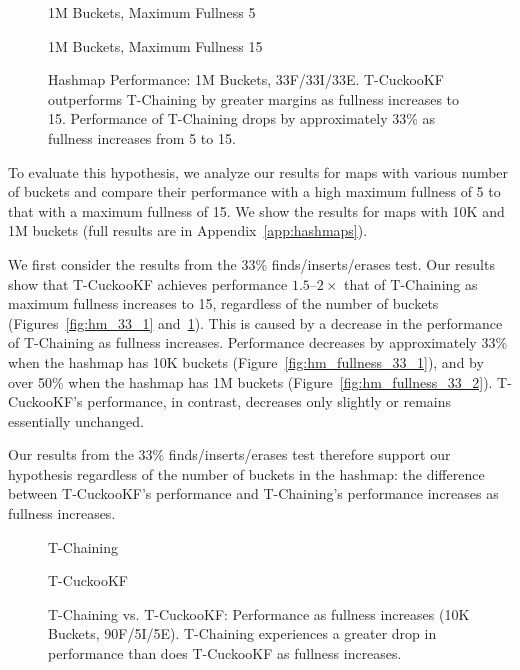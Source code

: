 \begin{figure}[H]
    \centering
    \begin{minipage}{0.75\textwidth}
    \caption*{1M Buckets, Maximum Fullness 5}
        \vspace{12pt}
    \end{minipage}
   \begin{minipage}{0.75\textwidth}
    \caption*{1M Buckets, Maximum Fullness 15}
        \vspace{12pt}
    \end{minipage}
	\caption[Hashmap Performance: 1M Buckets, 33F/33I/33E]{Hashmap Performance: 1M Buckets, 33F/33I/33E. T-CuckooKF outperforms T-Chaining by greater margins as fullness increases to 15. Performance of T-Chaining drops by approximately 33\% as fullness increases from 5 to 15.}
    \label{fig:hm_33_3}
\end{figure}

To evaluate this hypothesis, we analyze our results for maps with various number of buckets and compare their performance with a high maximum fullness of 5 to that with a maximum fullness of 15. We show the results for maps with 10K and 1M buckets (full results are in Appendix~\ref{app:hashmaps}).

We first consider the results from the 33\% finds/inserts/erases test. Our results show that T-CuckooKF achieves performance $1.5$--$2\times$ that of T-Chaining as maximum fullness increases to 15, regardless of the number of buckets (Figures~\ref{fig:hm_33_1} and~\ref{fig:hm_33_3}). 
This is caused by a decrease in the performance of T-Chaining as fullness increases. Performance decreases by approximately 33\% when the hashmap has 10K buckets (Figure~\ref{fig:hm_fullness_33_1}), and by over 50\% when the hashmap has 1M buckets (Figure~\ref{fig:hm_fullness_33_2}). T-CuckooKF's performance, in contrast, decreases only slightly or remains essentially unchanged.

Our results from the 33\% finds/inserts/erases test therefore support our hypothesis regardless of the number of buckets in the hashmap: the difference between T-CuckooKF's performance and T-Chaining's performance increases as fullness increases. 

\begin{figure}[H]
    \centering
    \begin{minipage}{0.7\textwidth}
    \caption*{T-Chaining}
        \vspace{12pt}
    \end{minipage}
    \begin{minipage}{0.7\textwidth}
    \caption*{T-CuckooKF}
    \end{minipage}
    \caption[T-Chaining vs. T-CuckooKF: Performance as fullness increases (10K Buckets, 90F/5I/5E)]{T-Chaining vs. T-CuckooKF: Performance as fullness increases (10K Buckets, 90F/5I/5E). T-Chaining experiences a greater drop in performance than does T-CuckooKF as fullness increases.}
    \label{fig:hm_fullness_90_1}
\end{figure}

